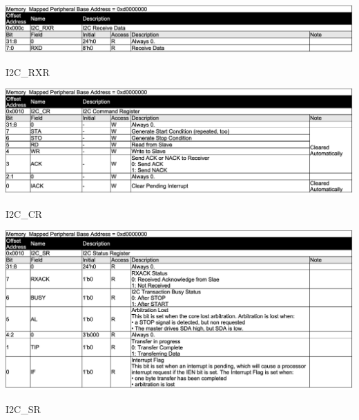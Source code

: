 \begin{table}[H]
    \includegraphics[width=1.0\columnwidth]{./Table/REG_I2C_RXR.png}
    \caption{I2C\_RXR}
    \label{tb:REG_I2C_RXR}
\end{table}
\begin{table}[H]
    \includegraphics[width=1.0\columnwidth]{./Table/REG_I2C_CR.png}
    \caption{I2C\_CR}
    \label{tb:REG_I2C_CR}
\end{table}
\begin{table}[H]
    \includegraphics[width=1.0\columnwidth]{./Table/REG_I2C_SR.png}
    \caption{I2C\_SR}
    \label{tb:REG_I2C_SR}
\end{table}


